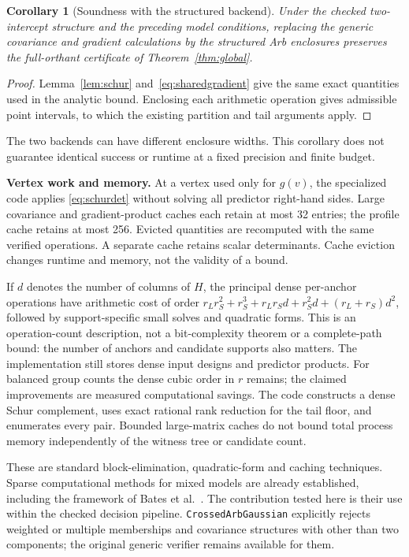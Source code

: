 \documentclass[11pt,a4paper]{article}
\newtheorem{corollary}[theorem]{Corollary}
\theoremstyle{remark}\newtheorem{remark}[theorem]{Remark}
\begin{document}
\begin{corollary}[Soundness with the structured backend]
Under the checked two-intercept structure and the preceding model conditions,
replacing the generic covariance and gradient calculations by the structured
Arb enclosures preserves the full-orthant certificate of Theorem~\ref{thm:global}.
\end{corollary}
\begin{proof}
Lemma~\ref{lem:schur} and~\eqref{eq:sharedgradient} give the same exact quantities
used in the analytic bound. Enclosing each arithmetic operation gives admissible
point intervals, to which the existing partition and tail arguments apply.
\end{proof}
The two backends can have different enclosure widths. This corollary does not
guarantee identical success or runtime at a fixed precision and finite budget.

\textbf{Vertex work and memory.}
At a vertex used only for $g(v)$, the specialized code applies
\eqref{eq:schurdet} without solving all predictor right-hand sides. Large
covariance and gradient-product caches each retain at most 32 entries; the
profile cache retains at most 256. Evicted quantities are recomputed with the
same verified operations. A separate cache retains scalar determinants.
Cache eviction changes runtime and memory, not the validity of a bound.

If $d$ denotes the number of columns of $H$, the principal dense per-anchor
operations have arithmetic cost of order
$r_Lr_S^2+r_S^3+r_Lr_Sd+r_S^2d+(r_L+r_S)d^2$, followed by support-specific
small solves and quadratic forms. This is an operation-count description, not
a bit-complexity theorem or a complete-path bound: the number of anchors and
candidate supports also matters. The implementation still stores dense input
designs and predictor products. For balanced group counts the dense cubic
order in $r$ remains; the claimed improvements are measured computational savings.
The code
constructs a dense Schur complement, uses exact
rational rank reduction for the tail floor, and enumerates every pair. Bounded
large-matrix caches do not bound total process memory independently of the
witness tree or candidate count.

These are standard block-elimination, quadratic-form and caching techniques.
Sparse computational methods for mixed models are already established, including
the framework of Bates et al.~\cite{lme4}. The contribution tested here is their
use within the checked decision pipeline. \texttt{CrossedArbGaussian} explicitly
rejects weighted or multiple memberships and covariance structures with other
than two components; the original generic verifier remains available for them.
\end{document}

